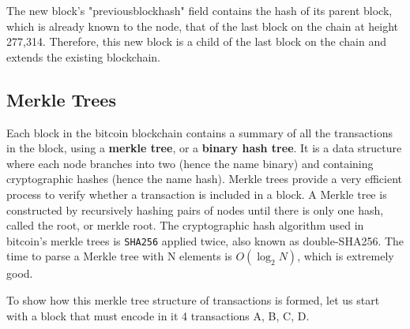 \documentclass{article}
\begin{document}
    The new block's "previousblockhash" field contains the hash of its parent block, which is already known to the node, that of the last block on the chain at height 277,314. Therefore, this new block is a child of the last block on the chain and extends the existing blockchain.

  \subsection{Merkle Trees}

    Each block in the bitcoin blockchain contains a summary of all the transactions in the block, using a \textbf{merkle tree}, or a \textbf{binary hash tree}. It is a data structure where each node branches into two (hence the name binary) and containing cryptographic hashes (hence the name hash). Merkle trees provide a very efficient process to verify whether a transaction is included in a block. A Merkle tree is constructed by recursively hashing pairs of nodes until there is only one hash, called the root, or merkle root. The cryptographic hash algorithm used in bitcoin's merkle trees is \texttt{SHA256} applied twice, also known as double-SHA256. The time to parse a Merkle tree with N elements is $O(\log_2 N)$, which is extremely good.

    To show how this merkle tree structure of transactions is formed, let us start with a block that must encode in it 4 transactions A, B, C, D.
\end{document}
